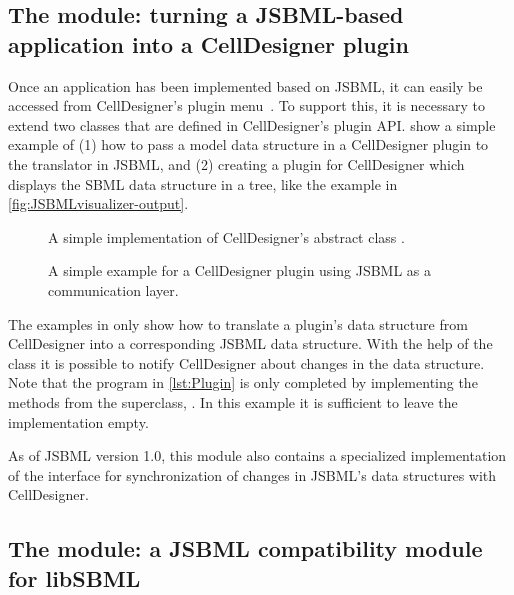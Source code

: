 \subsection{The  module: turning a JSBML-based
  application into a CellDesigner plugin}

Once an application has been implemented based on JSBML, it can easily be
accessed from CellDesigner's plugin menu~\citep{Funahashi2003}. To support
this, it is necessary to extend two classes that are defined in
CellDesigner's plugin API.  
show a simple example of (1) how to pass a model
data structure in a CellDesigner plugin to the translator in JSBML, and (2)
creating a plugin for CellDesigner which displays the SBML data structure
in a tree, like the example in \vref{fig:JSBMLvisualizer-output}.

\begin{figure}[thb]
  \caption{A simple implementation of CellDesigner's abstract class
    .}
  \label{lst:PluginAction}
\end{figure}

\begin{figure}[thb]
  \caption{A simple example for a CellDesigner plugin using JSBML as a
    communication layer.}
  \label{lst:Plugin}
\end{figure}

The examples in  only show
how to translate a plugin's data structure from CellDesigner into a
corresponding JSBML data structure. With the help of the class
\PluginSBMLWriter it is possible to notify CellDesigner about changes in
the data structure. Note that the program in \vref{lst:Plugin} is
only completed by implementing the methods from the superclass,
. In this example it is sufficient to leave the
implementation empty.

As of JSBML version 1.0, this module also contains a specialized
implementation of the \TreeNodeChangeListener{} interface for
synchronization of changes in JSBML's data structures with CellDesigner.

\subsection{The  module: a JSBML compatibility
  module for libSBML}

